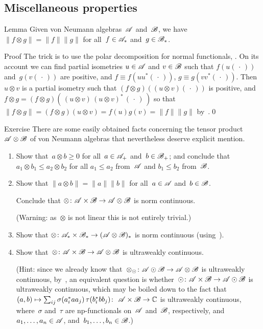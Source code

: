 \documentclass[a]{subfiles}
\begin{document}
\subsection{Miscellaneous properties}
\begin{parsec}%
\begin{point}{Lemma}%
Given von Neumann algebras~$\mathscr{A}$ and~$\mathscr{B}$,
we have $\|f\otimes g\|=\|f\|\|g\|$
for all~$f\in\mathscr{A}_*$ and~$g\in\mathscr{B}_*$.
\begin{point}{Proof}%
The trick is to use the polar decomposition
for normal functionals, .
On its account we can find partial isometries $u\in\mathscr{A}$
and $v\in\mathscr{B}$
such that
$f(u(\,\cdot\,))$
and~$g(v(\,\cdot\,))$ are positive,
and
$f\equiv f(uu^*(\,\cdot\,))$,  $g\equiv g(vv^*(\,\cdot\,))$.
Then $u\otimes v$ is a partial isometry
such that $(f\otimes g)((u\otimes v)(\,\cdot\,))$
is positive,
and $f\otimes g
= (f\otimes g)(\,(u\otimes v)\, (u\otimes v)^*\,(\,\cdot\,)\,)$
so that $\|f\otimes g\|=(f\otimes g)(u\otimes v)
= f(u)g(v)=\|f\|\|g\|$ by~.\qed
\end{point}
\end{point}
\begin{point}{Exercise}%
There are some easily obtained facts
concerning the tensor product~$\mathscr{A}\otimes\mathscr{B}$
of von Neumann algebras
that nevertheless deserve explicit mention.
\begin{enumerate}
\item
Show that~$a\otimes b\geq 0$
for all~$a\in\mathscr{A}_+$ and~$b\in\mathscr{B}_+$;
and conclude that $a_1\otimes b_1 \leq a_2\otimes b_2$
for all
$a_1\leq a_2$ from~$\mathscr{A}$ and $b_1\leq b_2$ from~$\mathscr{B}$.
\item
Show that $\|a\otimes b\| = \|a\|\|b\|$
for all~$a\in\mathscr{A}$ and~$b\in\mathscr{B}$.

Conclude that $\otimes\colon \mathscr{A}\times\mathscr{B}\to\mathscr{A}\otimes \mathscr{B}$
is norm continuous.

(Warning: as~$\otimes$ is not linear
this is not entirely trivial.)
\item
Show that $\otimes\colon \mathscr{A}_*\times\mathscr{B}_*\to(\mathscr{A}\otimes\mathscr{B})_*$
is norm continuous
(using~).
\item
Show that~$\otimes\colon \mathscr{A}\times \mathscr{B}\to \mathscr{A}\otimes \mathscr{B}$
is ultraweakly continuous.

(Hint: since we
already know that~$\otimes_\odot\colon \mathscr{A}\odot\mathscr{B}\to\mathscr{A}\otimes\mathscr{B}$
is ultraweakly continuous, by~,
an equivalent question 
is whether~$\odot\colon \mathscr{A}\times\mathscr{B}\to\mathscr{A}\odot\mathscr{B}$
is ultraweakly continuous,
which may be boiled down
to the fact
that $(a,b)\mapsto \sum_{ij} \sigma(a_i^* a a_j)\,\tau(b_i^* b b_j)\colon
\ \mathscr{A}\times \mathscr{B}\to\mathbb{C}$ is ultraweakly continuous,
where~$\sigma$ and~$\tau$ are np-functionals
on~$\mathscr{A}$ and~$\mathscr{B}$, respectively,
and
$a_1,\dotsc,a_n\in\mathscr{A}$, and~$b_1,\dotsc,b_n\in\mathscr{B}$.)


\end{enumerate}
\end{point}
\end{parsec}
\end{document}
